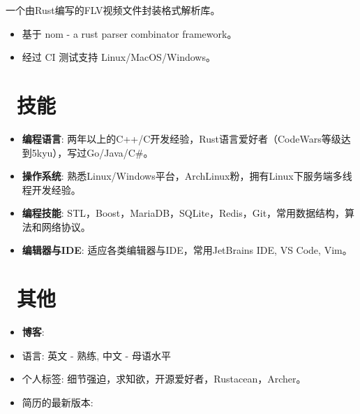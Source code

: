 \documentclass{resume}
\begin{document}
        一个由Rust编写的FLV视频文件封装格式解析库。
        \begin{itemize}
            \item 基于 nom - a rust parser combinator framework。
            \item 经过 CI 测试支持 Linux/MacOS/Windows。
        \end{itemize}

    \section{\faCogs\ 技能}
        \begin{itemize}
            \item \textbf{编程语言}: 两年以上的C++/C开发经验，Rust语言爱好者（CodeWars等级达到5kyu），写过Go/Java/C\#。

            \item \textbf{操作系统}: 熟悉Linux/Windows平台，ArchLinux粉，拥有Linux下服务端多线程开发经验。

            \item \textbf{编程技能}: STL，Boost，MariaDB，SQLite，Redis，Git，常用数据结构，算法和网络协议。

            \item \textbf{编辑器与IDE}: 适应各类编辑器与IDE，常用JetBrains IDE, VS Code, Vim。
        
        \end{itemize}

    \section{\faInfo\ 其他}
        \begin{itemize}
            \item \textbf{博客}: 
            \item 语言: 英文 - 熟练, 中文 - 母语水平
            \item 个人标签: 细节强迫，求知欲，开源爱好者，Rustacean，Archer。
            \item 简历的最新版本: 
        \end{itemize}


\end{document}
